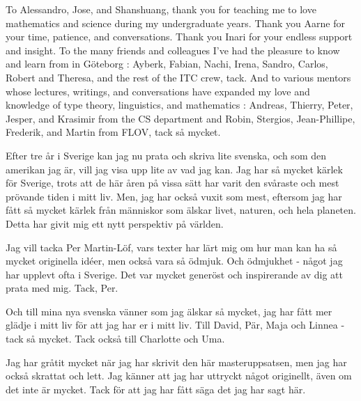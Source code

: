 \documentclass[11pt, a4paper]{article}
\begin{document}
To Alessandro, Jose, and Shanshuang, thank you for teaching me to love
mathematics and science during my undergraduate years. Thank you Aarne for your
time, patience, and conversations. Thank you Inari for your endless support and
insight. To the many friends and colleagues I've had the pleasure to know and learn
from in Göteborg : Ayberk, Fabian, Nachi, Irena, Sandro, Carlos, Robert and 
Theresa, and the rest of the ITC crew, tack. And to various mentors whose
lectures, writings, and conversations have expanded my love and knowledge of
type theory, linguistics, and mathematics : Andreas, Thierry, Peter, Jesper, and
Krasimir from the CS department and Robin, Stergios, Jean-Phillipe, Frederik,
and Martin from FLOV, tack så mycket.

Efter tre år i Sverige kan jag nu prata och skriva lite svenska, och som den
amerikan jag är, vill jag visa upp lite av vad jag kan. Jag har så mycket kärlek
för Sverige, trots att de här åren på vissa sätt har varit den svåraste och mest
prövande tiden i mitt liv. Men, jag har också vuxit som mest, eftersom jag har
fått så mycket kärlek från människor som älskar livet, naturen, och hela
planeten. Detta har givit mig ett nytt perspektiv på världen.

Jag vill tacka Per Martin-Löf, vars texter har lärt mig om hur man kan ha så
mycket originella idéer, men också vara så ödmjuk. Och ödmjukhet - något jag har
upplevt ofta i Sverige. Det var mycket generöst och inspirerande av dig att
prata med mig. Tack, Per.

Och till mina nya svenska vänner som jag älskar så mycket, jag har fått mer
glädje i mitt liv för att jag har er i mitt liv. Till David, Pär, Maja och
Linnea - tack så mycket. Tack också till Charlotte och Uma.

Jag har gråtit mycket när jag har skrivit den här masteruppsatsen, men jag har
också skrattat och lett. Jag känner att jag har uttryckt något originellt, även
om det inte är mycket. Tack för att jag har fått säga det jag har sagt här.

\thispagestyle{empty}

\newpage
\begin{spacing}{0.0}
\tableofcontents
\end{spacing}

\thispagestyle{empty}

\newpage
\setcounter{page}{1}
\end{document}
